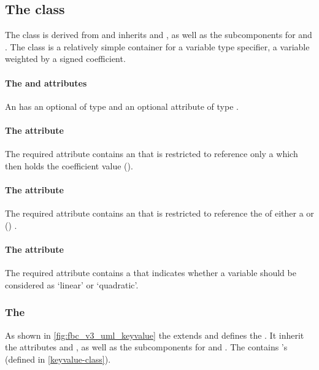 \subsection{The \FBC {} class}
\label{userconstraintcomponent-class}

The \FBC \UserConstraintComponent class is derived from \SBML \SBase and inherits
 and , as well as the subcomponents for
\Annotation and \Notes. The \UserConstraintComponent class is a relatively simple container for a variable type specifier, a variable weighted by a signed coefficient.

\paragraph{The  and  attributes}
An \UserConstraintComponent has an optional  of type  and an optional attribute  of type .

\paragraph{The  attribute}
The required  attribute contains an  that is restricted to reference only a \Parameter which then holds the coefficient value ().

\paragraph{The  attribute}
The required  attribute contains an  that is restricted to reference the  of either a \Reaction or () \Parameter.

\paragraph{The  attribute}
The required  attribute contains a  that indicates whether a variable should be considered as `linear' or `quadratic'.

\subsubsection{The \FBC {}}
\label{listofkeyvalues-class}
As shown in \ref{fig:fbc_v3_uml_keyvalue} the \ListOfKeyValues extends \SBase and defines the . It  inherit the
attributes  and , as well as the subcomponents for \Annotation and \Notes. The \ListOfKeyValues contains \KeyValue's (defined in \ref{keyvalue-class}).

